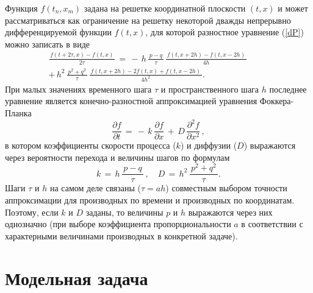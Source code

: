 \documentclass[a4paper]{report}
\begin{document}
Функция $f(t_n,x_m)$ задана на решетке координатной плоскости $(t,x)$ и может рассматриваться как ограничение на решетку некоторой дважды непрерывно дифференцируемой функции $f(t,x)$, для которой разностное уравнение (\ref{dP}) можно записать в виде
\begin{multline}\label{}
\frac{\,f(t+2\tau,x)-f(t,x)\,}{2\tau}\,=\,-\,h\,\frac{\,p-q\,}{\tau}\, \frac{\,f(t,x+2h)-f(t,x-2h)\,}{4h}\qquad\;\;\\
+\,h^2\,\frac{\,p^2+q^2\,}{\tau}\, \frac{\,f(t,x+2h)-2f(t,x)+f(t,x-2h)\,}{4h^2}.\nonumber
\end{multline}
При малых значениях временного шага $\tau$ и пространственного шага $h$ последнее уравнение является конечно-разностной аппроксимацией уравнения Фоккера-Планка
\begin{equation}\label{FP}
\frac{\partial{}f}{\partial{}t}\,=\,-\,k\, \frac{\partial{}f}{\partial{}x}\,+\,D\, \frac{\partial^2{}f}{\partial{}x^2}\,,
\end{equation}
в котором коэффициенты скорости процесса ($k$) и диффузии ($D$) выражаются через вероятности перехода и величины шагов по формулам
\begin{equation}\label{}
k\,=\,h\,\frac{\,p-q\,}{\tau}\,,\quad
D\,=\,h^2\,\frac{\,p^2+q^2\,}{\tau}.
\nonumber
\end{equation}
Шаги $\tau$ и $h$ на самом деле связаны ($\tau=ah$) совместным выбором точности аппроксимации для производных по времени и производных по координатам. Поэтому, если $k$ и $D$ заданы, то величины $p$ и $h$ выражаются через них однозначно (при выборе коэффициента пропорциональности $a$ в соответствии с характерными величинами производных в конкретной задаче).


\section{Модельная задача}
\end{document}
